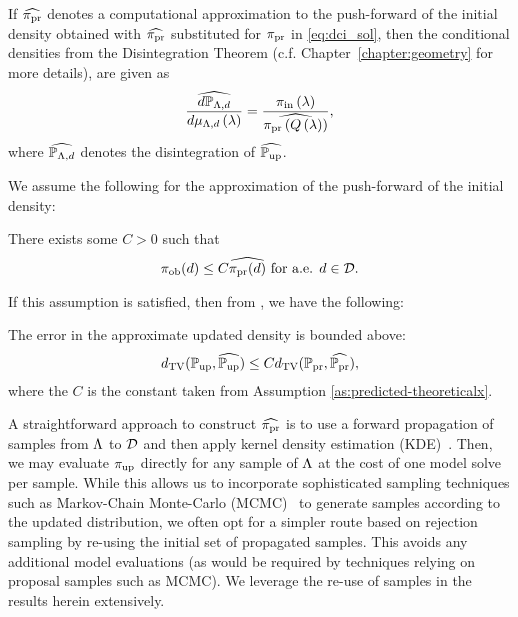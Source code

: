 
If $\widehat{\operatorname*{\pi_{pr}}}$ denotes a computational approximation to the push-forward of the initial density obtained with $\widehat{\operatorname*{\pi_{pr}}}$ substituted for $\operatorname*{\pi_{pr}}$ in \eqref{eq:dci_sol}, then the conditional densities from the Disintegration Theorem (c.f. Chapter~\ref{chapter:geometry} for more details), are given as
\[
\frac{\widehat{d\mathbb{P}_{{\Lambda}, d}}}{d\mu_{{\Lambda}, d}\left ( \lambda \right )} = \frac{\operatorname*{\pi_{in}}\left ( \lambda \right )}{ \widehat{\operatorname*{\pi_{pr}}\left ( Q\left ( \lambda \right ) \right )} },
\]
where $\widehat{\mathbb{P}_{{\Lambda}, d}}$ denotes the disintegration of $\widehat{\operatorname*{\mathbb{P}_{up}}}$.


We assume the following for the approximation of the push-forward of the initial density:
\begin{assumption}\label{as:predicted-theoreticalx}
There exists some $C>0$ such that
\[
\operatorname*{\pi_{ob}} (d) \leq C \widehat{\operatorname*{\pi_{pr}}(d)} \text{ for a.e. } d\in \mathcal{D}.
\]
\end{assumption}

If this assumption is satisfied, then from \cite{BJW18}, we have the following:
\begin{thm}\label{thm:predicted_bound}
  The error in the approximate updated density is bounded above:
  \begin{equation}\label{eq:predicted_bound}
    d_{\text{TV}} (\operatorname*{\mathbb{P}_{up}}, \widehat{\operatorname*{\mathbb{P}_{up}}}) \leq C d_{\text{TV}} (\operatorname*{\mathbb{P}_{pr}}, \widehat{\operatorname*{\mathbb{P}_{pr}}}),
  \end{equation}
  where the $C$ is the constant taken from Assumption \ref{as:predicted-theoreticalx}.
\end{thm}

A straightforward approach to construct $\widehat{\operatorname*{\pi_{pr}}}$ is to use a forward propagation of samples from ${\Lambda}$ to $\mathcal{D}$ and then apply kernel density estimation (KDE)~\cite{BJW18}.
Then, we may evaluate $\operatorname*{\pi_{up}}$ directly for any sample of ${\Lambda}$ at the cost of one model solve per sample.
While this allows us to incorporate sophisticated sampling techniques such as Markov-Chain Monte-Carlo (MCMC)~\cite{Smith, Tarantola_book} to generate samples according to the updated distribution, we often opt for a simpler route based on rejection sampling by re-using the initial set of propagated samples.
This avoids any additional model evaluations (as would be required by techniques relying on proposal samples such as MCMC).
We leverage the re-use of samples in the results herein extensively.

